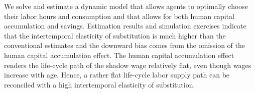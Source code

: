 We solve and estimate a dynamic model that allows agents to optimally choose their labor hours and consumption and that allows for both human capital accumulation and savings. Estimation results and simulation exercises indicate that the intertemporal elasticity of substitution is much higher than the conventional estimates and the downward bias comes from the omission of the human capital accumulation effect. The human capital accumulation effect renders the life-cycle path of the shadow wage relatively flat, even though wages increase with age.  Hence, a rather flat life-cycle labor supply path can be reconciled with a high intertemporal elasticity of substitution.